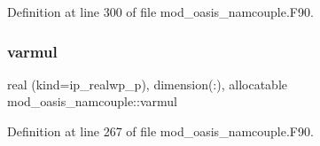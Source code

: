 Definition at line 300 of file mod\+\_\+oasis\+\_\+namcouple.\+F90.

\mbox{\label{namespacemod__oasis__namcouple_ab7c38fd6bd90bb8e6ebfb539ead1f1a9}} 
\subsubsection{\texorpdfstring{varmul}{varmul}}
{\footnotesize\ttfamily real (kind=ip\+\_\+realwp\+\_\+p), dimension(\+:), allocatable mod\+\_\+oasis\+\_\+namcouple\+::varmul\hspace{0.3cm}{\ttfamily [private]}}



Definition at line 267 of file mod\+\_\+oasis\+\_\+namcouple.\+F90.

